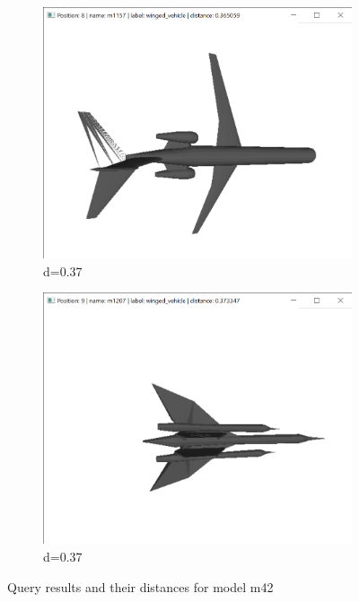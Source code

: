 \documentclass{bigdata}
\begin{document}
\begin{figure}[h!]
\begin{subfigure}[b]{0.09\linewidth}
    \includegraphics[width=\linewidth]{Pictures/Evaluation/m42/pos8.png}
    \caption*{d=0.37}
  \end{subfigure}
  \begin{subfigure}[b]{0.09\linewidth}
    \includegraphics[width=\linewidth]{Pictures/Evaluation/m42/pos9.png}
    \caption*{d=0.37}
  \end{subfigure}
  \caption{Query results and their distances for model m42}
  \label{fig:bunny}
\end{figure}
\end{document}
